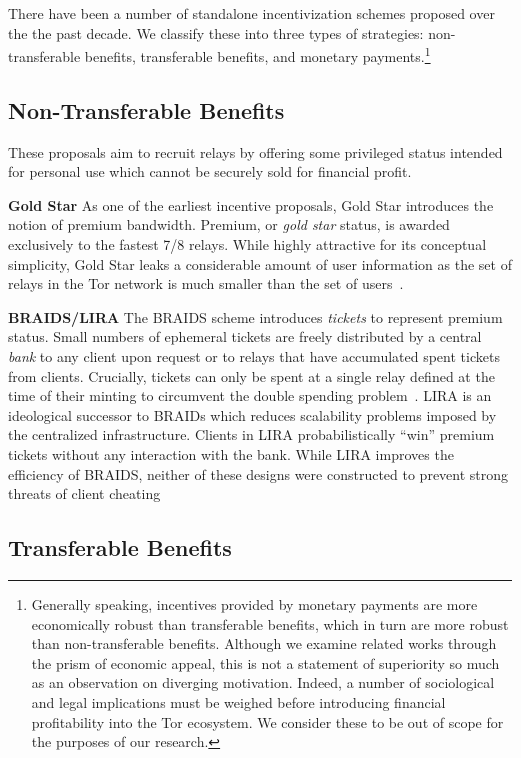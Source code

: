 There have been a number of standalone incentivization schemes proposed over the
the past decade. We classify these into three types of strategies:
non-transferable benefits, transferable benefits, and monetary
payments.\footnote{Generally speaking, incentives provided by monetary payments
  are more economically robust than transferable benefits, which in turn are
  more robust than non-transferable benefits. Although we examine related works
  through the prism of economic appeal, this is not a statement of superiority
  so much as an observation on diverging motivation. Indeed, a number of
  sociological and legal implications must be weighed before
  introducing financial profitability into the Tor ecosystem. We consider these
  to be out of scope for the purposes of our research.}

\subsection{Non-Transferable Benefits}

These proposals aim to recruit relays by offering some privileged status
intended for personal use which cannot be securely sold for financial profit.

\textbf{Gold Star} As one of the earliest incentive proposals, Gold Star
introduces the notion of premium bandwidth. Premium, or \emph{gold star} status,
is awarded exclusively to the fastest 7/8 relays. While highly attractive
for its conceptual simplicity, Gold Star leaks a considerable amount of user
information as the set of relays in the Tor network is much smaller than the set
of users~\cite{dingledine2010building}.

\textbf{BRAIDS/LIRA} The BRAIDS scheme introduces \emph{tickets} to represent
premium status. Small numbers of ephemeral tickets are freely distributed by a
central \emph{bank} to any client upon request or to relays that have
accumulated spent tickets from clients. Crucially, tickets can only be spent at
a single relay defined at the time of their minting to circumvent the double
spending problem~\cite{jansen2010recruiting}. LIRA is an ideological successor
to BRAIDs which reduces scalability problems imposed by the centralized
infrastructure. Clients in LIRA probabilistically ``win'' premium tickets
without any interaction with the bank. While LIRA improves the efficiency of
BRAIDS, neither of these designs were constructed to prevent strong threats of
client cheating~\cite{jansen2013lira}

\subsection{Transferable Benefits}

